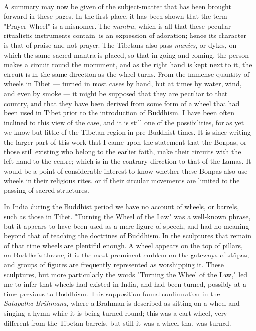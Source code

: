 \documentclass[a4paper, 11pt, oneside, polutonikogreek, english]{article}
\begin{document}
\paragraph{}
A summary may now be given of the subject-matter that has been brought forward in these pages. In the first place, it has been shown that the term "Prayer-Wheel" is a misnomer. The \emph{mantra}, which is all that these peculiar ritualistic instruments contain, is an expression of adoration; hence its character is that of praise and not prayer. The Tibetans also pass \emph{manies}, or dykes, on which the same sacred mantra is placed, so that in going and coming, the person makes a circuit round the monument, and as the right hand is kept next to it, the circuit is in the same direction as the wheel turns. From the immense quantity of wheels in Tibet --- turned in most cases by hand, but at times by water, wind, and even by smoke --- it might be supposed that they are peculiar to that country, and that they have been derived from some form of a wheel that had been used in Tibet prior to the introduction of Buddhism. I have been often inclined to this view of the case, and it is still one of the possibilities, for as yet we know but little of the Tibetan region in pre-Buddhist times. It is since writing the larger part of this work that I came upon the statement that the Bonpas, or those still existing who belong to the earlier faith, make their circuits with the left hand to the centre; which is in the contrary direction to that of the Lamas. It would be a point of considerable interest to know whether these Bonpas also use wheels in their religious rites, or if their circular movements are limited to the passing of sacred structures.

In India during the Buddhist period we have no account of wheels, or barrels, such as those in Tibet. "Turning the Wheel of the Law" was a well-known phrase, but it appears to have been used as a mere figure of speech, and had no meaning beyond that of teaching the doctrines of Buddhism. In the sculptures that remain of that time wheels are plentiful enough. A wheel appears on the top of pillars, on Buddha's throne, it is the most prominent emblem on the gateways of stûpas, and groups of figures are frequently represented as worshipping it. These sculptures, but more particularly the words "Turning the Wheel of the Law," led me to infer that wheels had existed in India, and had been turned, possibly at a time previous to Buddhism. This supposition found confirmation in the \emph{Satapatha-Brâhmana}, where a Brahman is described as sitting on a wheel and singing a hymn while it is being turned round; this was a cart-wheel, very different from the Tibetan barrels, but still it was a wheel that was turned.
\end{document}
